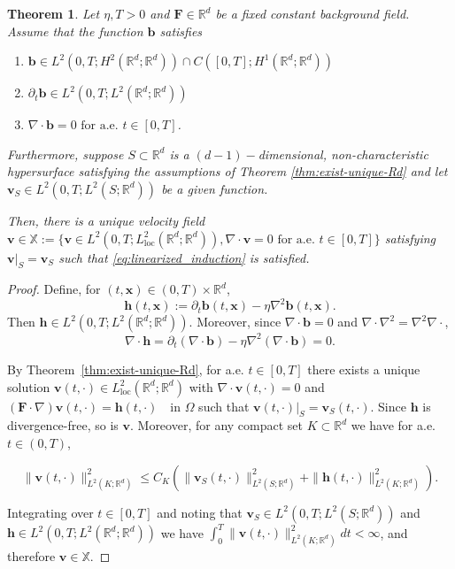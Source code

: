 \documentclass[12pt]{article}
\newtheorem{theorem}{Theorem}
\begin{document}
		\begin{theorem}\label{main-theorem-rd} Let $\eta, T>0$ and $\mathbf{F}\in \mathbb{R}^d$ be a fixed constant background field. Assume that the function $\boldsymbol{b}$ satisfies
        \begin{enumerate}
            \item $\boldsymbol{b} \in L^2(0,T;H^2(\mathbb{R}^d; \mathbb{R}^d)) \cap C([0,T];H^1(\mathbb{R}^d; \mathbb{R}^d))$
            \item $\partial_t \boldsymbol{b} \in L^2(0,T;L^2(\mathbb{R}^d; \mathbb{R}^d))$
            \item $\nabla\cdot \boldsymbol{b}=0 \textrm{ for a.e. } t \in [0,T]$.
        \end{enumerate}

        Furthermore, suppose $S\subset\mathbb{R}^{d}$ is a $(d-1)-$dimensional, non-characteristic hypersurface satisfying the assumptions of Theorem \ref{thm:exist-unique-Rd} and let $\boldsymbol{v}_S\in L^2(0,T; L^2(S;\mathbb{R}^d))$ be a given function.

        
Then, there is a unique velocity field $\boldsymbol{v}\in \mathbb{X}:=\{\boldsymbol{v}\in L^2(0,T; L^2_{\mathrm{loc}}(\mathbb{R}^d; \mathbb{R}^d)),  \nabla\cdot \boldsymbol{v}=0 \textrm{ for a.e. } t\in[0,T]\}$ satisfying $\boldsymbol{v}\vert_S=\boldsymbol{v}_S$ such that \eqref{eq:linearized_induction} is satisfied.
          
		\end{theorem}

        \begin{proof}
Define, for $(t,\boldsymbol x)\in(0,T)\times\mathbb{R}^d$,
\[
\boldsymbol h(t,\boldsymbol x)
:= \partial_t \boldsymbol b(t,\boldsymbol x)-\eta \nabla^2 \boldsymbol b(t,\boldsymbol x).
\]
Then $\boldsymbol h\in L^2(0,T;L^2(\mathbb{R}^d; \mathbb{R}^d))$. Moreover, since $\nabla\cdot \boldsymbol b=0$ and
$\nabla\cdot\nabla^2=\nabla^2\nabla\cdot$,
\[
\nabla\cdot \boldsymbol h
=\partial_t(\nabla\cdot \boldsymbol b)-\eta \nabla^2(\nabla\cdot \boldsymbol b)=0.
\]

By Theorem~\ref{thm:exist-unique-Rd}, for a.e. $t\in[0,T]$ there exists a unique solution $\boldsymbol v(t,\cdot)\in L^2_{\mathrm{loc}}(\mathbb{R}^d; \mathbb{R}^d)$ with $\nabla\cdot\boldsymbol v(t,\cdot)=0$ and
${{} (\mathbf{F}\cdot\nabla)\boldsymbol v(t,\cdot)=\boldsymbol h(t,\cdot)\quad\textrm{in }\Omega}$ such that $\boldsymbol{v}(t,\cdot)\vert_{S} = \boldsymbol{v}_S(t,\cdot)$. Since $\boldsymbol{h}$ is divergence-free, so is $\boldsymbol{v}$. Moreover, for any compact set $K\subset \mathbb{R}^d$ we have for a.e. $t\in(0,T)$,

\[
\|\boldsymbol v(t,\cdot)\|_{L^2(K; \mathbb{R}^d)}^2 \le C_K\left( \|\boldsymbol v_S(t,\cdot)\|^2_{L^2(S; \mathbb{R}^d)}  + \|\boldsymbol h(t,\cdot)\|^2_{L^2(K; \mathbb{R}^d)}\right).
\]

Integrating over $t\in [0,T]$ and noting that $\boldsymbol v_{S}\in L^2(0,T; L^2(S;\mathbb{R}^d))$ and $\boldsymbol{h}\in L^2(0,T; L^2(\mathbb{R}^d; \mathbb{R}^d))$ we have $\int_0^T\|\boldsymbol v(t,\cdot)\|_{L^2(K; \mathbb{R}^d)}^2dt<\infty$, and therefore $\boldsymbol v\in \mathbb{X}$.


\end{proof}
\end{document}
